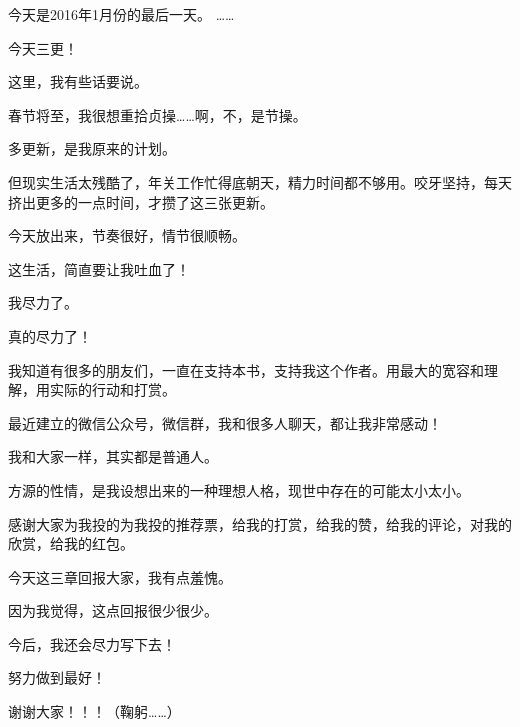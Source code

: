 
\begin{this_body} %

今天是2016年1月份的最后一天。  ……

今天三更！

这里，我有些话要说。

春节将至，我很想重拾贞操……啊，不，是节操。

多更新，是我原来的计划。

但现实生活太残酷了，年关工作忙得底朝天，精力时间都不够用。咬牙坚持，每天挤出更多的一点时间，才攒了这三张更新。

今天放出来，节奏很好，情节很顺畅。

这生活，简直要让我吐血了！

我尽力了。

真的尽力了！

我知道有很多的朋友们，一直在支持本书，支持我这个作者。用最大的宽容和理解，用实际的行动和打赏。

最近建立的微信公众号，微信群，我和很多人聊天，都让我非常感动！

我和大家一样，其实都是普通人。

方源的性情，是我设想出来的一种理想人格，现世中存在的可能太小太小。

感谢大家为我投的为我投的推荐票，给我的打赏，给我的赞，给我的评论，对我的欣赏，给我的红包。

今天这三章回报大家，我有点羞愧。

因为我觉得，这点回报很少很少。

今后，我还会尽力写下去！

努力做到最好！

谢谢大家！！！（鞠躬……）

\end{this_body}

